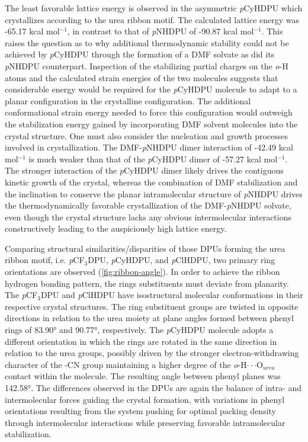 The least favorable lattice energy is observed in the asymmetric \textit{p}CyHDPU which crystallizes according to the urea ribbon motif. The calculated lattice energy was -65.17 kcal mol$^{-1}$, in contrast to that of \textit{p}NHDPU of -90.87 kcal mol$^{-1}$. This raises the question as to why additional thermodynamic stability could not be achieved by \textit{p}CyHDPU through the formation of a DMF solvate as did its \textit{p}NHDPU counterpart. Inspection of the stabilizing partial charges on the \textit{o}-H atoms and the calculated strain energies of the two molecules suggests that considerable energy would be required for the \textit{p}CyHDPU molecule to adapt to a planar configuration in the crystalline configuration. The additional conformational strain energy needed to force this configuration would outweigh the stabilization energy gained by incorporating DMF solvent molecules into the crystal structure. One must also consider the nucleation and growth processes involved in crystallization. The DMF-\textit{p}NHDPU dimer interaction of -42.49 kcal mol$^{-1}$ is much weaker than that of the \textit{p}CyHDPU dimer of -57.27 kcal mol$^{-1}$. The stronger interaction of the \textit{p}CyHDPU dimer likely drives the contiguous kinetic growth of the crystal, whereas the combination of DMF stabilization and the inclination to conserve the planar intramolecular structure of \textit{p}NHDPU drives the thermodynamically favorable crystallization of the DMF-\textit{p}NHDPU solvate, even though the crystal structure lacks any obvious intermolecular interactions constructively leading to the auspiciously high lattice energy. 

Comparing structural similarities/disparities of those DPUs forming the urea ribbon motif, i.e. \textit{p}CF$_{3}$DPU, \textit{p}CyHDPU, and \textit{p}ClHDPU, two primary ring orientations are observed (\autoref{fig:ribbon-angle}). In order to achieve the ribbon hydrogen bonding pattern, the rings substituents must deviate from planarity. The \textit{p}CF$_{3}$DPU and \textit{p}ClHDPU have isostructural molecular conformations in their respective crystal structures. The ring substituent groups are twisted in opposite directions in relation to the urea moiety at plane angles formed between phenyl rings of 83.90° and 90.77°, respectively. The \textit{p}CyHDPU molecule adopts a different orientation in which the rings are rotated in the same direction in relation to the urea groups, possibly driven by the stronger electron-withdrawing character of the -CN group maintaining a higher degree of the \textit{o}-H$\cdot \cdot \cdot$O$_{urea}$ contact within the molecule. The resulting angle between phenyl planes was 142.58°. The differences observed in the DPUs are again the balance of intra- and intermolecular forces guiding the crystal formation, with variations in phenyl orientations resulting from the system pushing for optimal packing density through intermolecular interactions while preserving favorable intramolecular stabilization.   


